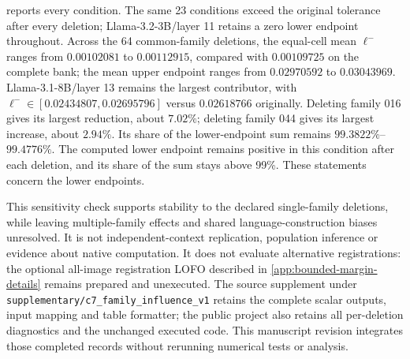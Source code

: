  reports every condition. The same 23 conditions exceed the original tolerance after every deletion; Llama-3.2-3B/layer 11 retains a zero lower endpoint throughout. Across the 64 common-family deletions, the equal-cell mean $\ell^-$ ranges from $0.00102081$ to $0.00112915$, compared with $0.00109725$ on the complete bank; the mean upper endpoint ranges from $0.02970592$ to $0.03043969$. Llama-3.1-8B/layer 13 remains the largest contributor, with $\ell^-\in[0.02434807,0.02695796]$ versus $0.02618766$ originally. Deleting family 016 gives its largest reduction, about $7.02\%$; deleting family 044 gives its largest increase, about $2.94\%$. Its share of the lower-endpoint sum remains $99.3822\%$--$99.4776\%$. The computed lower endpoint remains positive in this condition after each deletion, and its share of the sum stays above 99\%. These statements concern the lower endpoints.

This sensitivity check supports stability to the declared single-family deletions, while leaving multiple-family effects and shared language-construction biases unresolved. It is not independent-context replication, population inference or evidence about native computation. It does not evaluate alternative registrations: the optional all-image registration LOFO described in \cref{app:bounded-margin-details} remains prepared and unexecuted. The source supplement under \texttt{supplementary/c7\_family\_influence\_v1} retains the complete scalar outputs, input mapping and table formatter; the public project also retains all per-deletion diagnostics and the unchanged executed code. This manuscript revision integrates those completed records without rerunning numerical tests or analysis.
